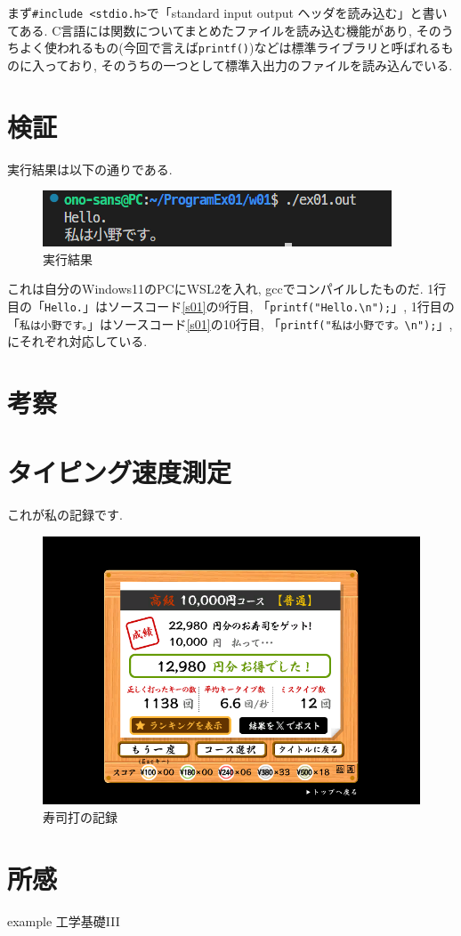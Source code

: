 \documentclass[a4paper, xelatex, ja=standard, 10.5pt]{bxjsarticle}
\begin{document}
まず\texttt{\#include <stdio.h>}で「standard input output ヘッダを読み込む」と書いてある.
C言語には関数についてまとめたファイルを読み込む機能があり,
そのうちよく使われるもの(今回で言えば\texttt{printf()})などは標準ライブラリと呼ばれるものに入っており,
そのうちの一つとして標準入出力のファイルを読み込んでいる.

\section{検証}
実行結果は以下の通りである.
\begin{figure}[H]
\centering
\includegraphics[scale=1.0]{img/wsl_result.png}
\caption{実行結果}
\label{}
\end{figure}
これは自分のWindows11のPCにWSL2を入れ, gccでコンパイルしたものだ.
1行目の「\texttt{Hello.}」はソースコード\ref{s01}の9行目,
「\texttt{printf("Hello.\textbackslash n");}」,
1行目の「\texttt{私は小野です。}」はソースコード\ref{s01}の10行目,
「\texttt{printf("私は小野です。\textbackslash n");}」,
にそれぞれ対応している.

\section{考察}
\section{タイピング速度測定}
これが私の記録です.
\begin{figure}[H]
\centering
\includegraphics[scale=1.0]{img/sushida.png}
\caption{寿司打の記録}
\label{}
\end{figure}

\section{所感}

\begin{thebibliography}{9} %
  example 工学基礎I\hspace{-1.2pt}I\hspace{-1.2pt}I
\end{thebibliography}
\end{document}
